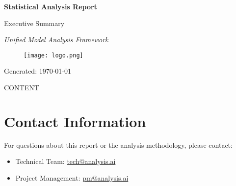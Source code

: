 \documentclass[12pt,letterpaper]{report}
\begin{document}
\begin{titlepage}
    \centering
    \vspace*{2cm}

    {\Huge\bfseries Statistical Analysis Report\par}
    \vspace{1cm}
    {\Large Executive Summary\par}
    \vspace{2cm}

    {\Large\itshape Unified Model Analysis Framework\par}
    \vspace{1.5cm}

    \begin{figure}[h]
        \centering
        \texttt{[image: logo.png]}
    \end{figure}

    \vfill

    {\large Generated: \today\par}
    \vspace{1cm}

    \begin{abstract}
        \noindent
        This executive report provides key insights from the comprehensive statistical analysis of model merging operations. Critical findings include Fisher information overlap analysis, task interference risk assessment, and actionable recommendations for model deployment strategies.
    \end{abstract}

    \vspace{2cm}
\end{titlepage}

\tableofcontents
\newpage

{{ CONTENT }}

\chapter{Contact Information}
For questions about this report or the analysis methodology, please contact:
\begin{itemize}
    \item Technical Team: \href{mailto:tech@analysis.ai}{tech@analysis.ai}
    \item Project Management: \href{mailto:pm@analysis.ai}{pm@analysis.ai}
\end{itemize}
\end{document}
